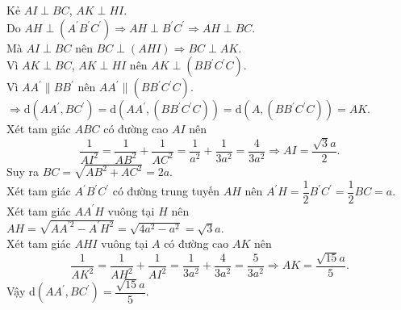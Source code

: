 \begin{ex}
{\begin{center}
\begin{tikzpicture}[scale=0.8,font=\footnotesize,line join=round,line cap=round,>=stealth]
				\end{tikzpicture}
		\end{center}
		Kẻ $A I \perp B C$, $A  K \perp H I$.\\
		Do $A H \perp\left(A^{\prime} B^{\prime} C^{\prime}\right) \Rightarrow A  H \perp B^{\prime} C^{\prime} \Rightarrow A H \perp B C$.\\
		Mà  $A I \perp B C$ nên $B C \perp(A H I) \Rightarrow B C \perp A K$.\\
		Vì $A K  \perp B C$, $A K \perp H I$ nên $A K \perp\left(B B^{\prime} C^{\prime} C\right)$.\\
		Vì $A A^{\prime}\parallel B B^{\prime}$  nên $A A^{\prime}\parallel\left(B B^{\prime} C^{\prime} C\right)$.\\
		$\Rightarrow \mathrm{d}\left(A A^{\prime}, B C^{\prime}\right)=\mathrm{d}\left(A A^{\prime},\left(B B^{\prime}  C^{\prime} C\right)\right)=\mathrm{d}\left(A,\left(B B^{\prime} C^{\prime} C\right)\right)=A K$.\\
		Xét tam giác $A B C$  có đường cao $A I$ nên\\
		\[\dfrac{1}{A I^{2}}=\dfrac{1}{A B^{2}}+\dfrac{1}{A C^{2}}=\dfrac{1}{a^{2}}+\dfrac{1}{3 a^{2}}=\dfrac{4}{3  a^{2}} \Rightarrow AI=\dfrac{\sqrt{3} a}{2}.\]
		Suy ra $B C=\sqrt{A B^{2}+A  C^{2}}=2 a$.\\
		Xét tam giác $A^{\prime} B^{\prime} C^{\prime}$ có  đường trung tuyến $A H$ nên $A^{\prime} H=\dfrac{1}{2} B^{\prime} C^{\prime}=\dfrac{1}{2} B C=a$.\\
		Xét tam giác $A A^{\prime}  H$ vuông tại $H$ nên\\
		 $A H=\sqrt{A A^{\prime 2}-A^{\prime} H^{2}}=\sqrt{4 a^{2}-a^{2}}=\sqrt{3} a$.\\
		Xét tam giác $A H I$ vuông tại $A$ có đường cao $A K$  nên \[\dfrac{1}{A K^{2}}=\dfrac{1}{A H^{2}}+\dfrac{1}{A I^{2}}=\dfrac{1}{3 a^{2}}+\dfrac{4}{3 a^{2}}=\dfrac{5}{3 a^{2}} \Rightarrow A K=\dfrac{\sqrt{15} a}{5}.\]
	 Vậy $\mathrm{d}\left(A A^{\prime}, B C^{\prime}\right)=\dfrac{\sqrt{15} a}{5}$.}
\end{ex}

